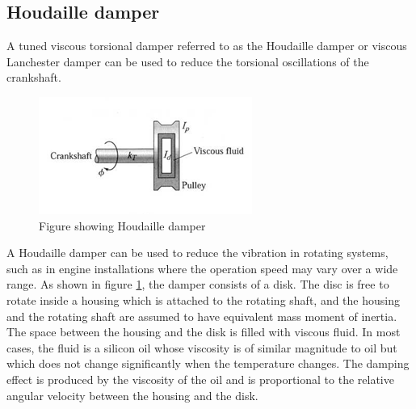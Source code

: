 \subsection{Houdaille damper}
A tuned viscous torsional damper referred to as the Houdaille damper or viscous Lanchester damper can be used to reduce the torsional oscillations of the crankshaft.
\begin{figure}[h]
\centering
\includegraphics[scale=1.3]{"figures/hdamp"}
\caption{Figure showing Houdaille damper}
\label{hdamp}
\end{figure}
 A Houdaille damper can be used to reduce the vibration in rotating systems, such as in engine installations where the operation speed may vary over a wide range. As shown in figure \ref{hdamp}, the damper consists of a disk. The disc is free to rotate inside a housing which is attached to the rotating shaft, and the housing and the rotating shaft are assumed to have equivalent mass moment of inertia. The space between the housing and the disk is filled with viscous fluid. In most cases, the fluid is a silicon oil whose viscosity is of similar magnitude to oil but which does not change significantly when the temperature changes. The damping effect is produced by the viscosity of the oil and is proportional to the relative angular velocity between the housing and the disk.
 
